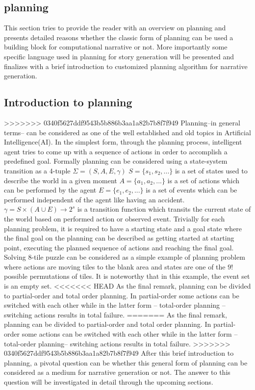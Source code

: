 \documentclass[english]{tktltiki}
\begin{document}
\subsection{planning}
This section tries to provide the reader with an overview on planning and presents detailed reasons whether the classic form of planning can be used a building block for computational narrative or not. More importantly some specific language used in planning for story generation will be presented and finalizes with a brief introduction to customized planning algorithm for narrative generation. 
\subsection{Introduction to planning}
>>>>>>> 0340f5627ddf9543b5b886b3aa1a82b7b8f7f949
Planning--in general terms-- can be considered as one of the well established and old topics in Artificial Intelligence(AI). In the simplest form, through the planning process, intelligent agent tries to come up with a sequence of actions in order to accomplish a predefined goal. Formally planning can be considered using a state-system transition as a 4-tuple $\Sigma = (S,A,E,\gamma)$\newline
$S=\{s_1,s_2,...\}$ is a set of states used to describe the world in a given moment\newline
$A=\{a_1,a_2,...\}$ is a set of actions which can be performed by the agent\newline
$E=\{e_1,e_2,...\}$ is a set of events which can be performed independent of the agent like having an accident.\newline
$\gamma = S\times(A \cup E) \longrightarrow 2^s$ is a transition function which transits the current state of the world based on performed action or observed event. \newline
Trivially for each planning problem, it is required to have a starting state and a goal state where the final goal on the planning can be described as getting started at starting point, executing the planned sequence of actions and reaching the final goal.
Solving 8-tile puzzle can be considered as a simple example of planning problem where actions are moving tiles to the blank area and states are one of the $9!$ possible permutations of tiles. It is noteworthy that in this example, the event set is an empty set.
<<<<<<< HEAD
As the final remark, planning can be divided to partial-order and total order planning. In partial-order some actions can be switched with each other while in the latter form -- total-order planning -- switching actions results in total failure.
=======
As the final remark, planning can be divided to partial-order and total order planning. In partial-order some actions can be switched with each other while in the latter form --total-order planning-- switching actions results in total failure.
>>>>>>> 0340f5627ddf9543b5b886b3aa1a82b7b8f7f949
After this brief introduction to planning, a pivotal question can be whether this general form of planning can be considered as a medium for narrative generation or not. The answer to this question will be investigated in detail through the upcoming sections.
\end{document}
